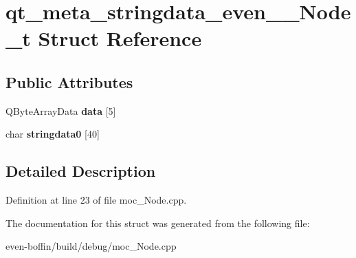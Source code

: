 \hypertarget{structqt__meta__stringdata__even_____node__t}{}\section{qt\+\_\+meta\+\_\+stringdata\+\_\+even\+\_\+\+\_\+\+Node\+\_\+t Struct Reference}
\label{structqt__meta__stringdata__even_____node__t}
\subsection*{Public Attributes}
\begin{DoxyCompactItemize}
\item 
\mbox{\label{structqt__meta__stringdata__even_____node__t_a1df604f52f080058d0a229ee89981c8f}} 
Q\+Byte\+Array\+Data {\bfseries data} \mbox{[}5\mbox{]}
\item 
\mbox{\label{structqt__meta__stringdata__even_____node__t_af8b7f42caf4748b6388a405407f76745}} 
char {\bfseries stringdata0} \mbox{[}40\mbox{]}
\end{DoxyCompactItemize}


\subsection{Detailed Description}


Definition at line 23 of file moc\+\_\+\+Node.\+cpp.



The documentation for this struct was generated from the following file\+:\begin{DoxyCompactItemize}
\item 
even-\/boffin/build/debug/moc\+\_\+\+Node.\+cpp\end{DoxyCompactItemize}
